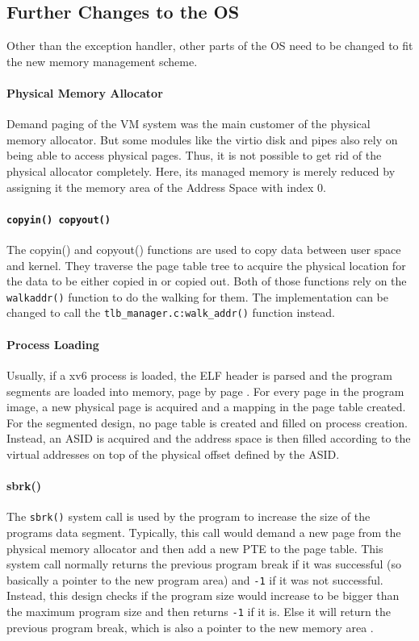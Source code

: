 \subsection{Further Changes to the OS}
Other than the exception handler, other parts of the OS need to be changed to fit the new memory management scheme.

\paragraph{Physical Memory Allocator} %
Demand paging of the VM system was the main customer of the physical memory allocator.
But some modules like the virtio disk and pipes also rely on being able to access physical pages. Thus, it is not
possible to get rid of the physical allocator completely.
Here, its managed memory is merely reduced by assigning it the memory area of the Address Space with index 0.

\paragraph{\texttt{copyin() copyout()}} The copyin() and copyout() functions are used to copy data between
user space and kernel. They traverse the page table tree to acquire the physical location for the data
to be either copied in or copied out.
Both of those functions rely on the \texttt{walkaddr()} function to do the walking for them.
The implementation can be changed to call the \texttt{tlb\_manager.c:walk\_addr()} function instead.

\paragraph{Process Loading} %
Usually, if a xv6 process is loaded, the ELF header \cite{tisexecutable} is parsed and the program segments are loaded into memory, page by page \cite{cox2011xv6}. For every page in the program image, a new physical page is acquired and a mapping in the page table created. For the segmented design, no page table is created and filled on process creation. Instead, an ASID is acquired and the address space is then filled according to the virtual addresses on top of the physical offset defined by the ASID.

\paragraph{sbrk()}The \texttt{sbrk()} system call is used by the program to increase the size
of the programs data segment. Typically, this call would demand a new page from the physical memory allocator
and then add a new PTE to the page table.
This system call normally returns the previous program break if it was successful (so basically a pointer to
the new program area) and \texttt{-1} if it was not successful.
Instead, this design checks if the program size would increase to be bigger than the maximum program size and
then returns \texttt{-1} if it is. Else it will return the previous program break, which is also a pointer to the new memory area \cite{rochkind2004advanced}.


